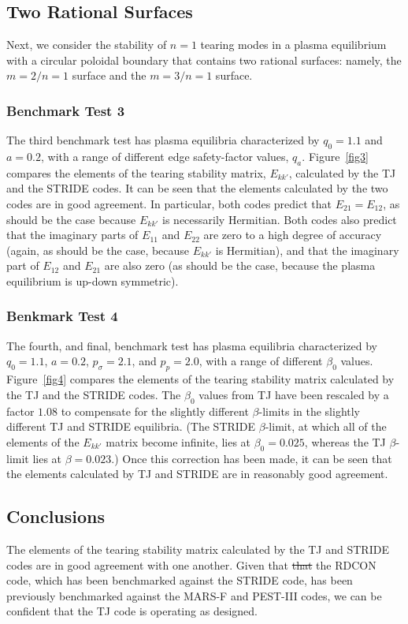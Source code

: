 \documentclass[12pt,prb,aps]{revtex4-1}
\providecommand{\DIFdel}[1]{{\protect\color{red}\sout{#1}}}                      %
\providecommand{\DIFdelbegin}{} %
\providecommand{\DIFdelend}{} %
\newcommand{\DIFscaledelfig}{0.5}
\newlength{\DIFdelgraphicswidth} %
\newlength{\DIFdelgraphicsheight} %
\newcommand{\DIFdelincludegraphics}[2][]{%
\sbox{\DIFdelgraphicsbox}{\DIFOincludegraphics[#1]{#2}}%
\settoboxwidth{\DIFdelgraphicswidth}{\DIFdelgraphicsbox} %
\settoboxtotalheight{\DIFdelgraphicsheight}{\DIFdelgraphicsbox} %
\scalebox{\DIFscaledelfig}{%
\parbox[b]{\DIFdelgraphicswidth}{\usebox{\DIFdelgraphicsbox}\\[-\baselineskip] \rule{\DIFdelgraphicswidth}{0em}}\llap{\resizebox{\DIFdelgraphicswidth}{\DIFdelgraphicsheight}{%
\setlength{\unitlength}{\DIFdelgraphicswidth}%
\begin{picture}(1,1)%
\thicklines\linethickness{2pt} %
{\color[rgb]{1,0,0}\put(0,0){\framebox(1,1){}}}%
{\color[rgb]{1,0,0}\put(0,0){\line( 1,1){1}}}%
{\color[rgb]{1,0,0}\put(0,1){\line(1,-1){1}}}%
\end{picture}%
}\hspace*{3pt}}} %
} %
\DeclareRobustCommand{\DIFdelbegin}{\DIFOdelbegin \let\includegraphics\DIFdelincludegraphics} %
\DeclareRobustCommand{\DIFdelend}{\DIFOaddend \let\includegraphics\DIFOincludegraphics} %
\begin{document}
\subsection{Two Rational Surfaces}
 Next, we consider the stability of $n=1$ tearing modes 
in a  plasma equilibrium with a circular poloidal boundary  that  contains two rational surfaces: namely, the $m=2/n=1$ surface and the $m=3/n=1$ surface. 

\subsubsection{Benchmark Test 3}
The third benchmark test has plasma equilibria characterized by $q_0=1.1$ and $a=0.2$, with a range of different edge safety-factor values, $q_a$. 
Figure~\ref{fig3} compares the elements of the tearing stability matrix, $E_{kk'}$,  calculated by the TJ and the STRIDE codes. It can be seen that the elements calculated by
the two codes are in good agreement. In particular, both codes predict that $E_{21}=E_{12}$, as should be the case because $E_{kk'}$ is necessarily Hermitian.\cite{tj} 
Both codes also predict that the imaginary parts of $E_{11}$ and $E_{22}$ are zero to a high degree of accuracy (again, as should be the case, because $E_{kk'}$ is Hermitian),
and that the imaginary part of $E_{12}$ and $E_{21}$ are also zero (as should be the case, because the plasma equilibrium is up-down symmetric). 

\subsubsection{Benkmark Test 4}
The fourth, and final,  benchmark test has plasma equilibria characterized by $q_0=1.1$, $a=0.2$, $p_\sigma = 2.1$, and $p_p=2.0$, with a range of different $\beta_0$ values.  
Figure~\ref{fig4} compares the elements of the tearing stability matrix calculated by the TJ and the STRIDE codes. The $\beta_0$ values from TJ have been rescaled
by a factor $1.08$ to compensate for the slightly different $\beta$-limits in the slightly different TJ and STRIDE equilibria. (The STRIDE $\beta$-limit, at which all of the
elements of the $E_{kk'}$ matrix become infinite,  lies at
$\beta_0=0.025$, whereas the TJ $\beta$-limit lies at $\beta=0.023$.)
 Once this correction has been made, it can be seen that the elements calculated by
TJ and STRIDE are in reasonably good agreement.  

\subsection{Conclusions}
The elements of the tearing stability matrix calculated by the TJ and STRIDE codes are in good agreement with one another. Given  that \DIFdelbegin \DIFdel{that }\DIFdelend the RDCON code,
which has been benchmarked against the STRIDE code, has been previously benchmarked against the MARS-F and PEST-III codes,\cite{am2,aglas2} we can be confident  that the TJ code is operating as designed. 
\end{document}
